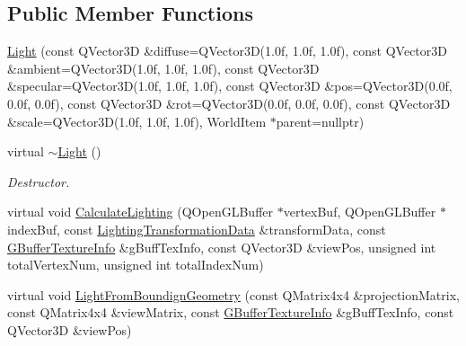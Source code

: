 \subsection*{Public Member Functions}
\begin{DoxyCompactItemize}
\item 
\mbox{\hyperlink{class_geometry_engine_1_1_geometry_world_item_1_1_geometry_light_1_1_light_a9dcea4ccc13220212d25379a52dd82b2}{Light}} (const Q\+Vector3D \&diffuse=Q\+Vector3D(1.\+0f, 1.\+0f, 1.\+0f), const Q\+Vector3\+D \&ambient=\+Q\+Vector3\+D(1.\+0f, 1.\+0f, 1.\+0f), const Q\+Vector3\+D \&specular=\+Q\+Vector3\+D(1.\+0f, 1.\+0f, 1.\+0f), const Q\+Vector3\+D \&pos=\+Q\+Vector3\+D(0.\+0f, 0.\+0f, 0.\+0f), const Q\+Vector3\+D \&rot=\+Q\+Vector3\+D(0.\+0f, 0.\+0f, 0.\+0f), const Q\+Vector3\+D \&scale=\+Q\+Vector3\+D(1.\+0f, 1.\+0f, 1.\+0f), World\+Item $\ast$parent=nullptr)
\item 
\mbox{\label{class_geometry_engine_1_1_geometry_world_item_1_1_geometry_light_1_1_light_af87a5bfe23c9ccf5c84d42e5ac4af0f7}} 
virtual \mbox{\hyperlink{class_geometry_engine_1_1_geometry_world_item_1_1_geometry_light_1_1_light_af87a5bfe23c9ccf5c84d42e5ac4af0f7}{$\sim$\+Light}} ()
\begin{DoxyCompactList}\small\item\em Destructor. \end{DoxyCompactList}\item 
virtual void \mbox{\hyperlink{class_geometry_engine_1_1_geometry_world_item_1_1_geometry_light_1_1_light_a4a133e49941a68ac8c33f757e687c8b7}{Calculate\+Lighting}} (Q\+Open\+G\+L\+Buffer $\ast$vertex\+Buf, Q\+Open\+G\+L\+Buffer $\ast$index\+Buf, const \mbox{\hyperlink{struct_geometry_engine_1_1_lighting_transformation_data}{Lighting\+Transformation\+Data}} \&transform\+Data, const \mbox{\hyperlink{struct_geometry_engine_1_1_g_buffer_texture_info}{G\+Buffer\+Texture\+Info}} \&g\+Buff\+Tex\+Info, const Q\+Vector3D \&view\+Pos, unsigned int total\+Vertex\+Num, unsigned int total\+Index\+Num)
\item 
virtual void \mbox{\hyperlink{class_geometry_engine_1_1_geometry_world_item_1_1_geometry_light_1_1_light_a4dfee4fc27c75493f992a84c2ea3ff95}{Light\+From\+Boundign\+Geometry}} (const Q\+Matrix4x4 \&projection\+Matrix, const Q\+Matrix4x4 \&view\+Matrix, const \mbox{\hyperlink{struct_geometry_engine_1_1_g_buffer_texture_info}{G\+Buffer\+Texture\+Info}} \&g\+Buff\+Tex\+Info, const Q\+Vector3D \&view\+Pos)

\end{DoxyCompactItemize}
